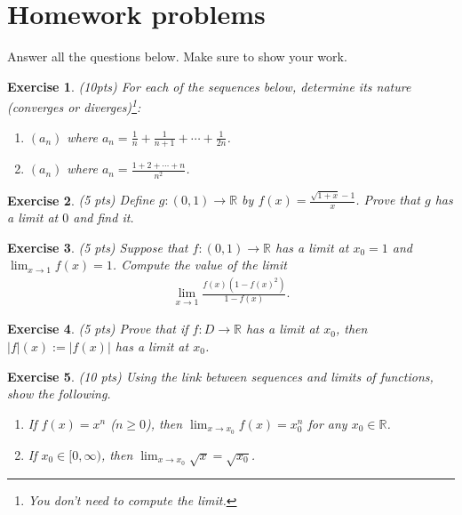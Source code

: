 \documentclass[12pt]{article}
\newcommand{\bR}{\mathbb{R}}
\newcommand{\ra}{\rightarrow}
\theoremstyle{plain}
\newtheorem{exer}{\textbf{Exercise}}}
\theoremstyle{plain}
\begin{document}
\section{Homework problems}
Answer all the questions below. Make sure to show your work.

\begin{exer}
(10pts)
For each of the sequences below, determine its nature (converges or diverges)\footnote{You don't need to compute the limit.}:
	\begin{enumerate}[label=\textbf{\alph*)}]
	\item $(a_n)$ where $a_n = \frac{1}{n} + \frac{1}{n + 1} + \cdots + \frac{1}{2n}$.
	\item $(a_n)$ where $a_n = \frac{1 + 2 + \cdots + n}{n^2}$.
	\end{enumerate}
\end{exer}


\begin{exer}
(5 pts)
Define $g: (0, 1) \ra \bR$ by $f(x) = \frac{\sqrt{1 + x} - 1}{x}$. Prove that $g$ has a limit at $0$ and find it.
\end{exer}

\begin{exer}
(5 pts)
Suppose that $f: (0, 1) \ra \bR$ has a limit at $x_0 = 1$ and $\lim_{x \ra 1} f(x) = 1$. Compute the value of the limit
	\begin{align*}
	\lim_{x \ra 1} \frac{f(x) (1 - f(x)^2)}{1 - f(x)} .
	\end{align*}
\end{exer}

\begin{exer}
(5 pts)
Prove that if $f: D \ra \bR$ has a limit at $x_0$, then $|f|(x) := |f(x)|$ has a limit at $x_0$.
\end{exer}

\begin{exer}
(10 pts)
Using the link between sequences and limits of functions, show the following.
	\begin{enumerate}[label=\textbf{\alph*)}]
	\item If $f(x) = x^n$ ($n \geq 0$), then $\lim_{x \ra x_0} f(x) = x_0^n$ for any $x_0 \in \bR$.
	\item If $x_0 \in [0, \infty )$, then $\lim_{x \ra x_0} \sqrt{x} = \sqrt{x_0}$.
\end{enumerate}	 
\end{exer}
\end{document}
